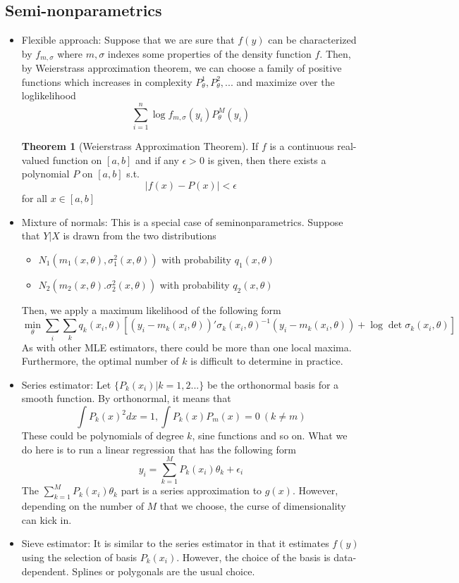 \documentclass[12pt]{article}
\theoremstyle{definition}
\theoremstyle{property}
\theoremstyle{assumption}
\theoremstyle{example}
\theoremstyle{comment}
\newtheorem{theorem}{Theorem}[section]
\begin{document}
  \subsection{Semi-nonparametrics}
\begin{itemize}
\item Flexible approach: Suppose that we are sure that $f(y)$ can be characterized by $f_{m,\sigma}$ where $m,\sigma$ indexes some properties of the density function $f$. Then, by Weierstrass approximation theorem, we can choose a family of positive functions which increases in complexity $P_\theta^1, P_\theta^2,...$ and maximize over the loglikelihood
\[
\sum_{i=1}^n \log{f_{m,\sigma}(y_i)}P_\theta^M(y_i)
\]
\begin{mdframed}[backgroundcolor=green!5] 
\begin{theorem}[Weierstrass Approximation Theorem]  If $f$ is a continuous real-valued function on $[a,b]$ and if any $\epsilon>0$ is given, then there exists a polynomial $P$ on $[a,b]$ s.t. 
\[
|f(x)-P(x)|<\epsilon
\]
for all $x\in[a,b]$
\end{theorem}
\end{mdframed}
\item Mixture of normals: This is a special case of seminonparametrics. Suppose that $Y|X$ is drawn from the two distributions
\begin{itemize}
\item $N_1(m_1(x,\theta), \sigma_1^2(x,\theta))$ with probability $q_1(x,\theta)$
\item $N_2(m_2(x,\theta). \sigma_2^2(x,\theta))$ with probability $q_2(x,\theta)$
\end{itemize}
Then, we apply a maximum likelihood of the following form
\[
\min_\theta \sum_i\sum_k q_k(x_i,\theta)[(y_i-m_k(x_i,\theta))'\sigma_k(x_i,\theta)^{-1}(y_i-m_k(x_i,\theta))+\log\det{\sigma_k(x_i,\theta)}]
\]
As with other MLE estimators, there could be more than one local maxima. Furthermore, the optimal number of $k$ is difficult to determine in practice.
\item Series estimator: Let $\{P_k(x_i)|k=1,2...\}$ be the orthonormal basis for a smooth function. By orthonormal, it means that
\[
\int P_k(x)^2 dx=1, \int P_k(x) P_m(x)=0 \ (k\neq m)
\]
 These could be polynomials of degree $k$, sine functions and so on. What we do here is to run a linear regression that has the following form
\[
y_i = \sum_{k=1}^MP_k(x_i)\theta_k+\epsilon_i
\]
The $\sum_{k=1}^MP_k(x_i)\theta_k$ part is a series approximation to $g(x)$. However, depending on the number of $M$ that we choose, the curse of dimensionality can kick in. 
\item Sieve estimator: It is similar to the series estimator in that it estimates $f(y)$ using the selection of basis $P_k(x_i)$. However, the choice of the basis is data-dependent. Splines or polygonals are the usual choice.
\end{itemize}
\end{document}
